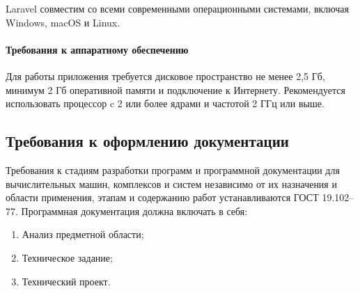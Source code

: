 Laravel совместим со всеми современными операционными системами, включая Windows, macOS и Linux.

\paragraph{Требования к аппаратному обеспечению}
Для работы приложения требуется дисковое пространство не менее 2,5 Гб, минимум 2 Гб оперативной памяти и подключение к Интернету. Рекомендуется использовать процессор c 2 или более ядрами и частотой 2 ГГц или выше.

\subsection{Требования к оформлению документации}
Требования к стадиям разработки программ и программной документации для вычислительных машин, комплексов и систем независимо от их назначения и области применения, этапам и содержанию работ устанавливаются ГОСТ 19.102–77. 
Программная документация должна включать в себя: 
\begin{enumerate}
	\item Анализ предметной области;
	\item Техническое задание;
	\item Технический проект.
\end{enumerate}
